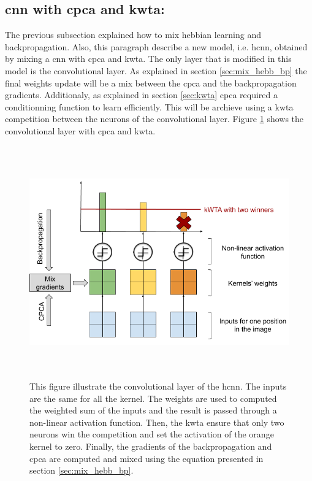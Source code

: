 \documentclass[11pt]{report}
\begin{document}
\subsection{\acrshort{cnn} with \acrshort{cpca} and \acrshort{kwta}:}
The previous subsection explained how to mix hebbian learning and backpropagation. Also, this paragraph describe a new model, i.e. \acrshort{hcnn}, obtained by mixing a \acrshort{cnn} with \acrshort{cpca} and \acrshort{kwta}. The only layer that is modified in this model is the convolutional layer. As explained in section \ref{sec:mix_hebb_bp} the final weights update will be a mix between the \acrshort{cpca} and the backpropagation gradients. Additionaly, as explained in section \ref{sec:kwta} \acrshort{cpca} required a conditionning function to learn efficiently. This will be archieve using a \acrshort{kwta} competition between the neurons of the convolutional layer. Figure \ref{fig:hcnn} shows the convolutional layer with \acrshort{cpca} and \acrshort{kwta}.

\begin{figure}[h]
\centering
\includegraphics[width=15cm, height=10cm]{hcnn}
\caption{This figure illustrate the convolutional layer of the \acrlong{hcnn}. The inputs are the same for all the kernel. The weights are used to computed the weighted sum of the inputs and the result is passed through a non-linear activation function. Then, the \acrshort{kwta} ensure that only two neurons win the competition and set the activation of the orange kernel to zero. Finally, the gradients of the backpropagation and \acrshort{cpca} are computed and mixed using the equation presented in section \ref{sec:mix_hebb_bp}.}
\label{fig:hcnn}
\end{figure}
\end{document}
